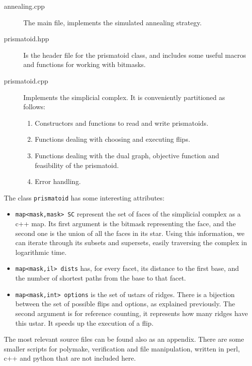 \documentclass[12pt,a4paper]{article}
\theoremstyle{plain}
\theoremstyle{definition}
\begin{document}
\begin{description}
  \item[annealing.cpp] The main file, implements the simulated annealing strategy.
  \item[prismatoid.hpp] Is the header file for the prismatoid class, and includes some useful macros and functions for working with bitmasks.
  \item[prismatoid.cpp] Implements the simplicial complex. It is conveniently partitioned as follows:
    \begin{enumerate}
      \item Constructors and functions to read and write prismatoids.
      \item Functions dealing with choosing and executing flips.
      \item Functions dealing with the dual graph, objective function and feasibility of the prismatoid.
      \item Error handling.
    \end{enumerate}
\end{description}

The class \lstinline{prismatoid} has some interesting attributes:

\begin{itemize}
  \item \lstinline{map<mask,mask> SC} represent the set of faces of the simplicial complex as a c++ map. Its first argument is the bitmask representing the face, and the second one is the union of all the faces in its star. Using this information, we can iterate through its subsets and supersets, easily traversing the complex in logarithmic time.
  \item \lstinline{map<mask,il> dists} has, for every facet, its distance to the first base, and the number of shortest paths from the base to that facet.

  \item \lstinline{map<mask,int> options} is the set of ustars of ridges. There is a bijection between the set of possible flips and options, as explained previously. The second argument is for reference counting, it represents how many ridges have this ustar. It speeds up the execution of a flip.
\end{itemize}

The most relevant source files can be found also as an appendix. There are some smaller scripts for polymake, verification and file manipulation, written in perl, c++ and python that are not included here.
\end{document}

